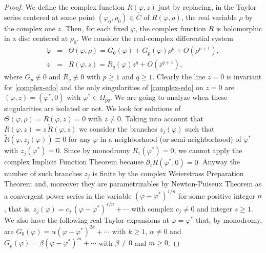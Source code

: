 \documentclass[12pt]{amsart}
\begin{document}
\begin{proof}
We define the complex function $R(\varphi, z)$ just by replacing, in the Taylor series centered at some point $(\varphi_0, \rho_0) \in \hat{C}$ of $R(\varphi, \rho)$, the real variable $\rho$ by the complex one $z$. Then, for each fixed $\varphi$, the complex function $R$ is holomorphic in a disc centered at $\rho_0$. We consider the real-complex differential system
\begin{equation}\label{complex-edo}
\begin{array}{lll}
\dot{\varphi} &=& \Theta(\varphi, \rho) = G_0(\varphi) + G_p(\varphi) \rho^p + O(\rho^{p+1}), \\
\dot{z} &=& R(\varphi, z) = R_q(\varphi) z^q + O(z^{q+1}),
\end{array}
\end{equation}
where $G_p \not\equiv 0$ and $R_q \not\equiv 0$ with $p\geq 1$ and $q \geq 1$. Clearly the line $z=0$ is invariant for \eqref{complex-edo} and the only singularities of \eqref{complex-edo} on $z=0$ are $(\varphi, z) = (\varphi^*, 0)$ with $\varphi^* \in \Omega_{pq}$. We are going to analyze when these singularities are isolated or not. We look for solutions of $\Theta(\varphi, \rho) = R(\varphi, z) = 0$ with $z \neq 0$. Taking into account that $R(\varphi, z) = z \,  \tilde{R}(\varphi, z)$ we consider the branches $z_j(\varphi)$ such that $\tilde{R}(\varphi, z_j(\varphi)) \equiv 0$ for any $\varphi$ in a neighborhood  (or semi-neighborhood) of $\varphi^*$ with $z_j(\varphi^*)=0$. Since by monodromy $R_1(\varphi^*) = 0$, we cannot apply the complex Implicit Function Theorem because $\partial_z \tilde{R}(\varphi^*, 0) = 0$. Anyway the number of such branches $z_j$ is finite by the complex Weierstrass Preparation Theorem and, moreover they are parametrizables by Newton-Puiseux Theorem as a convergent power series in the variable $(\varphi-\varphi^*)^{1/n}$ for some positive integer $n$, that is, $z_j(\varphi) = c_j \, (\varphi-\varphi^*)^{s/n} + \cdots$ with complex $c_j \neq 0$ and integer $s \geq 1$. We also have the following real Taylor expansions at $\varphi=\varphi^*$ that, by monodromy, are $G_0(\varphi) = \alpha (\varphi-\varphi^*)^{2k} + \cdots$ with $k \geq 1$, $\alpha \neq 0$ and $G_p(\varphi) = \beta  (\varphi-\varphi^*)^{m} + \cdots$ with $\beta \neq 0$ and $m \geq 0$.


\end{proof}
\end{document}
